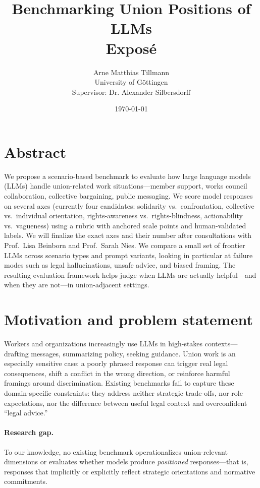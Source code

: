 \documentclass[11pt,a4paper]{article}
\title{Benchmarking Union Positions of LLMs\\\large Expos\'e }
\author{Arne Matthias Tillmann\\University of G\"ottingen\\Supervisor: Dr. Alexander Silbersdorff}
\date{\today}
\begin{document}
\maketitle

\section*{Abstract}
We propose a scenario-based benchmark to evaluate how large language models (LLMs) handle union-related work situations---member support, works council collaboration, collective bargaining, public messaging. We score model responses on several axes (currently four candidates: solidarity vs.\ confrontation, collective vs.\ individual orientation, rights-awareness vs.\ rights-blindness, actionability vs.\ vagueness) using a rubric with anchored scale points and human-validated labels. We will finalize the exact axes and their number after consultations with Prof.\ Lisa Beinborn and Prof.\ Sarah Nies. We compare a small set of frontier LLMs across scenario types and prompt variants, looking in particular at failure modes such as legal hallucinations, unsafe advice, and biased framing. The resulting evaluation framework helps judge when LLMs are actually helpful---and when they are not---in union-adjacent settings.

\section{Motivation and problem statement}
Workers and organizations increasingly use LLMs in high-stakes contexts---drafting messages, summarizing policy, seeking guidance. Union work is an especially sensitive case: a poorly phrased response can trigger real legal consequences, shift a conflict in the wrong direction, or reinforce harmful framings around discrimination. Existing benchmarks fail to capture these domain-specific constraints: they address neither strategic trade-offs, nor role expectations, nor the difference between useful legal context and overconfident ``legal advice.''

\paragraph{Research gap.}
To our knowledge, no existing benchmark operationalizes union-relevant dimensions or evaluates whether models produce \emph{positioned} responses---that is, responses that implicitly or explicitly reflect strategic orientations and normative commitments.
\end{document}
